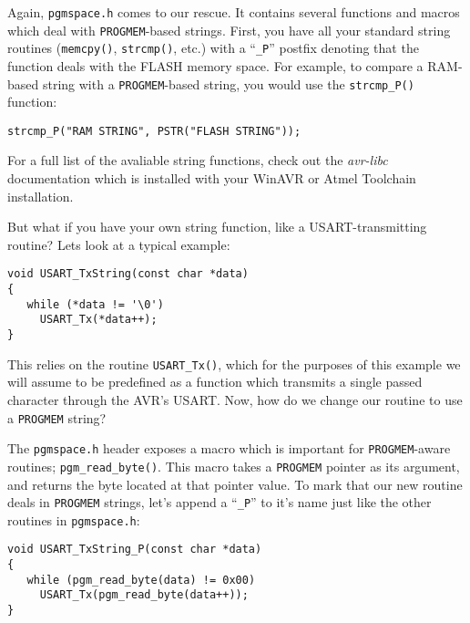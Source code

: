 \documentclass[a4paper,oneside,notitlepage]{book}
\begin{document}
Again, \lstinline{pgmspace.h} comes to our rescue. It contains several functions and macros which deal with \lstinline{PROGMEM}-based strings. First, you have all your standard string routines (\lstinline{memcpy()}, \lstinline{strcmp()}, etc.) with a ``\lstinline{_P}'' postfix denoting that the function deals with the FLASH memory space. For example, to compare a RAM-based string with a \lstinline{PROGMEM}-based string, you would use the \lstinline{strcmp_P()} function:

\begin{center}
\begin{lstlisting}
strcmp_P("RAM STRING", PSTR("FLASH STRING"));
\end{lstlisting}
\end{center}

For a full list of the avaliable string functions, check out the \textit{avr-libc} documentation which is installed with your WinAVR or Atmel Toolchain installation.

But what if you have your own string function, like a USART-transmitting routine? Lets look at a typical example:

\begin{center}
\begin{lstlisting}
void USART_TxString(const char *data)
{
   while (*data != '\0')
     USART_Tx(*data++);
}
\end{lstlisting}
\end{center}

This relies on the routine \lstinline{USART_Tx()}, which for the purposes of this example we will assume to be predefined as a function which transmits a single passed character through the AVR's USART. Now, how do we change our routine to use a \lstinline{PROGMEM} string?

The \lstinline{pgmspace.h} header exposes a macro which is important for \lstinline{PROGMEM}-aware routines; \lstinline{pgm_read_byte()}. This macro takes a \lstinline{PROGMEM} pointer as its argument, and returns the byte located at that pointer value. To mark that our new routine deals in \lstinline{PROGMEM} strings, let's append a ``\lstinline{_P}'' to it's name just like the other routines in \lstinline{pgmspace.h}:

\begin{center}
\begin{lstlisting}
void USART_TxString_P(const char *data)
{
   while (pgm_read_byte(data) != 0x00)
     USART_Tx(pgm_read_byte(data++));
}
\end{lstlisting}
\end{center}
\end{document}
